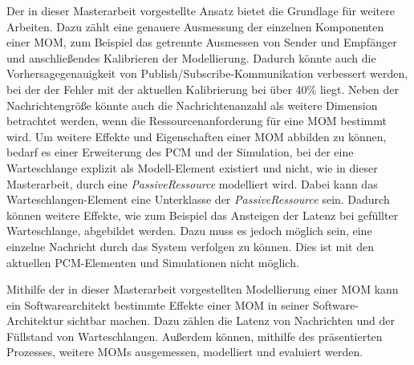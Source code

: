 Der in dieser Masterarbeit vorgestellte Ansatz bietet die Grundlage für weitere Arbeiten. Dazu zählt eine genauere Ausmessung der einzelnen Komponenten einer MOM, zum Beispiel das getrennte Ausmessen von Sender und Empfänger und anschließendes Kalibrieren der Modellierung. Dadurch könnte auch die Vorhersagegenauigkeit von Publish/Subscribe-Kommunikation verbessert werden, bei der der Fehler mit der aktuellen Kalibrierung bei über 40\% liegt. Neben der Nachrichtengröße könnte auch die Nachrichtenanzahl als weitere Dimension betrachtet werden, wenn die Ressourcenanforderung für eine MOM bestimmt wird. Um weitere Effekte und Eigenschaften einer MOM abbilden zu können, bedarf es einer Erweiterung des PCM und der Simulation, bei der eine Warteschlange explizit als Modell-Element existiert und nicht, wie in dieser Masterarbeit, durch eine \emph{PassiveRessource} modelliert wird. Dabei kann das Warteschlangen-Element eine Unterklasse der \emph{PassiveRessource} sein. Dadurch können weitere Effekte, wie zum Beispiel das Ansteigen der Latenz bei gefüllter Warteschlange, abgebildet werden. Dazu muss es jedoch möglich sein, eine einzelne Nachricht durch das System verfolgen zu können. Dies ist mit den aktuellen PCM-Elementen und Simulationen nicht möglich. \par
Mithilfe der in dieser Masterarbeit vorgestellten Modellierung einer MOM kann ein Softwarearchitekt bestimmte Effekte einer MOM in seiner Software-Architektur sichtbar machen. Dazu zählen die Latenz von Nachrichten und der Füllstand von Warteschlangen. Außerdem können, mithilfe des präsentierten Prozesses, weitere MOMs ausgemessen, modelliert und evaluiert werden. 